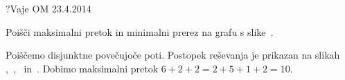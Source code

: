 \begin{naloga}{?}{Vaje OM 23.4.2014}
\begin{vprasanje}
Poišči maksimalni pretok in minimalni prerez na grafu s slike~\fig{}.

\begin{slika}
\pgfslika
{}
\end{slika}
\end{vprasanje}

\begin{odgovor}
Poiščemo disjunktne povečujoče poti.
Postopek reševanja je prikazan na slikah~%
,~,~ in~.
Dobimo maksimalni pretok $6+2+2 = 2+5+1+2 = 10$.

\begin{slika}
\pgfslika[pretok1a]
\end{slika}
\begin{slika}
\pgfslika[pretok1b]
\end{slika}
\begin{slika}
\pgfslika[pretok1c]
\end{slika}
\begin{slika}
\pgfslika[pretok1d]
\end{slika}
\end{odgovor}
\end{naloga}
